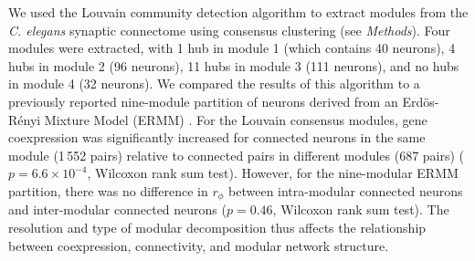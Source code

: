 \documentclass[10pt,letterpaper]{article}
\begin{document}
We used the Louvain community detection algorithm \cite{Blondel:2008do} to extract modules from the \emph{C. elegans} synaptic connectome using consensus clustering (see \textit{Methods}).
Four modules were extracted, with 1 hub in module 1 (which contains 40 neurons), 4 hubs in module 2 (96 neurons), 11 hubs in module 3 (111 neurons), and no hubs in module 4 (32 neurons).
We compared the results of this algorithm to a previously reported nine-module partition of neurons derived from an Erd\"os-R\'enyi Mixture Model (ERMM) \cite{Pavlovic2014}.
For the Louvain consensus modules, gene coexpression was significantly increased for connected neurons in the same module (1\,552 pairs) relative to connected pairs in different modules (687 pairs) ($p = 6.6 \times 10^{-4}$, Wilcoxon rank sum test).
However, for the nine-modular ERMM partition, there was no difference in $r_\phi$ between intra-modular connected neurons and inter-modular connected neurons ($p = 0.46$, Wilcoxon rank sum test).
The resolution and type of modular decomposition thus affects the relationship between coexpression, connectivity, and modular network structure.
\end{document}
